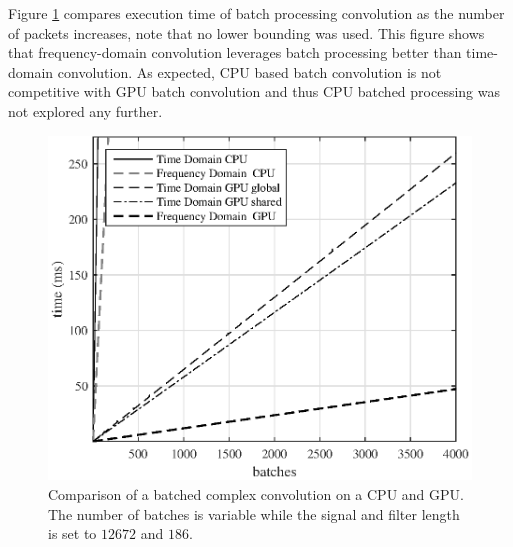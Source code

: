 Figure \ref{fig:CPUvsGPU_varyBatches_186taps_12672signal} compares execution time of batch processing convolution as the number of packets increases, note that no lower bounding was used.
This figure shows that frequency-domain convolution leverages batch processing better than time-domain convolution.
As expected, CPU based batch convolution is not competitive with GPU batch convolution and thus CPU batched processing was not explored any further.
\begin{figure}
	\centering\includegraphics[width=5in]{figures/gpu_intro/CPUvsGPU_varyBatches_186taps_12672signal.eps}
	\caption{Comparison of a batched complex convolution on a CPU and GPU. The number of batches is variable while the signal and filter length is set to $12672$ and $186$.}
	\label{fig:CPUvsGPU_varyBatches_186taps_12672signal}
\end{figure}

